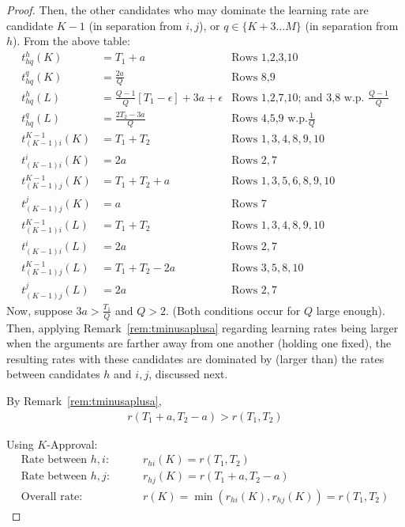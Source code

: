 \documentclass[10pt]{article}
\begin{document}
\begin{ReviewVerbatim}
\begin{proof}
Then, the other candidates who may dominate the learning rate are candidate $K-1$ (in separation from $i, j$), or $q\in\{K+3 \dots M \}$ (in separation from $h$). From the above table:
	\begin{align*}
	t_{hq}^{h}(K) &= T_1+a	& \text{Rows 1,2,3,10}\\
	t_{hq}^{q}(K) &= \frac{2a}{Q}	& \text{Rows 8,9} \\
	t_{hq}^{h}(L) &= \frac{Q-1}{Q}\left[T_1 - \epsilon \right] + 3a + \epsilon	& \text{Rows 1,2,7,10; and 3,8 w.p. } \frac{Q-1}{Q} \\
	t_{hq}^{q}(L) &= \frac{2T_2 - 3a}{Q}	& \text{Rows 4,5,9 w.p.}  \frac{1}{Q}\\
%
%
%
t_{(K-1)i}^{K-1}(K) &= T_1+T_2 & \text{Rows } 1,3,4,8,9,10\\%
t_{(K-1)i}^{i}(K) &= 2a	& \text{Rows } 2,7\\
t_{(K-1)j}^{K-1}(K) &= T_1 + T_2+a	& \text{Rows } 1,3,5,6,8,9,10\\
t_{(K-1)j}^{j}(K) &= a	& \text{Rows } 7\\
t_{(K-1)i}^{K-1}(L) &= T_1+T_2 & \text{Rows } 1,3,4,8,9,10\\
t_{(K-1)i}^{i}(L) &= 2a	& \text{Rows } 2,7\\
t_{(K-1)j}^{K-1}(L) &= T_1 + T_2 - 2a	& \text{Rows } 3,5,8,10\\
t_{(K-1)j}^{j}(L) &= 2a	& \text{Rows } 2,7
	\end{align*}
Now, suppose $3a > \frac{T_1}{Q}$ and $Q>2$. (Both conditions occur for $Q$ large enough). Then, applying Remark~\ref{rem:tminusaplusa} regarding learning rates being larger when the arguments are farther away from one another (holding one fixed), the resulting rates with these candidates are dominated by (larger than) the rates between candidates $h$ and $i,j$, discussed next.

%

%

By Remark~\ref{rem:tminusaplusa},
\begin{align*}
r(T_1+a,T_2-a) >r(T_1,T_2)
%
%
\end{align*}

Using $K$-Approval:
\begin{align*}
\text{Rate between $h,i$: }\,\,\,\,\,\,\,\,\,\,\ &r_{hi}(K) = r(T_1,T_2)\\
\text{Rate between $h,j$: }\,\,\,\,\,\,\,\,\,\,\ &r_{hj}(K) = r(T_1+a,T_2-a)\\
\text{Overall rate: }\,\,\,\,\,\,\,\,\,\,\ &r(K) = \min(r_{hi}(K),r_{hj}(K)) = r(T_1,T_2)
\end{align*}


\end{proof}
\end{ReviewVerbatim}
\end{document}
